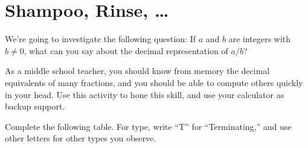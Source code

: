 \newpage
\section{Shampoo, Rinse, \dots}\label{A:Shampoo}

We're going to investigate the following question: If $a$ and $b$ are
integers with $b \ne 0$, what can you say about the decimal
representation of $a/b$? 

As a middle school teacher, you should know from memory the decimal equivalents of many fractions, and 
you should be able to compute others quickly in your head.  Use this activity to hone this skill, and use your calculator 
as backup support.  

\begin{prob}\label{AR:exp} 
Complete the following table.  For type, write ``T'' for ``Terminating,'' and use other letters for other types you observe.  



\end{prob}
